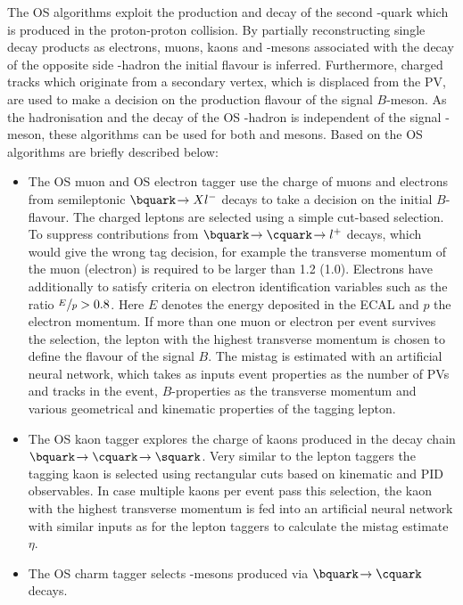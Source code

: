 The OS algorithms exploit the production and decay of the second \bquark-quark which is produced in the proton-proton collision.
By partially reconstructing single decay products as electrons, muons, kaons and \D-mesons associated with the decay of the opposite side \bquark-hadron the initial flavour is inferred.
Furthermore, charged tracks which originate from a secondary vertex, which is displaced from the \ac{PV}, are used to make a decision on the production flavour of the signal $B$-meson.
As the hadronisation and the decay of the OS \bquark-hadron is independent of the signal \B-meson, these algorithms can be used for both \Bz and \Bs mesons. Based on \cite{LHCb-PAPER-2011-027, LHCb-PAPER-2015-027} the OS algorithms are briefly described below:
\begin{itemize}
    \item The OS muon and OS electron tagger use the charge of muons and electrons from semileptonic $\bquark\!\to Xl^-$ decays to take a decision on the initial $B$-flavour.
    The charged leptons are selected using a simple cut-based selection.
    To suppress contributions from $\bquark\!\to\cquark\!\to l^+$ decays, which would give the wrong tag decision, for example the transverse momentum of the muon (electron) is required to be larger than \SI[per-mode=symbol]{1.2}{\GeVc} (\SI[per-mode=symbol]{1.0}{\GeVc}).
    Electrons have additionally to satisfy criteria on electron identification variables such as the ratio $\nicefrac{E\,}{p}>0.8$.
    Here $E$ denotes the energy deposited in the ECAL and $p$ the electron momentum.
    If more than one muon or electron per event survives the selection, the lepton with the highest transverse momentum is chosen to define the flavour of the signal $B$.
    The mistag is estimated with an artificial neural network, which takes as inputs event properties as the number of \ac{PV}s and tracks in the event, $B$-properties as the transverse momentum and various geometrical and kinematic properties of the tagging lepton.
    \item The OS kaon tagger explores the charge of kaons produced in the decay chain $\bquark\!\to\cquark\!\to\squark$.
    Very similar to the lepton taggers the tagging kaon is selected using rectangular cuts based on kinematic and PID observables.
    In case multiple kaons per event pass this selection, the kaon with the highest transverse momentum is fed into an artificial neural network with similar inputs as for the lepton taggers to calculate the mistag estimate $\eta$.
    \item The OS charm tagger selects \D-mesons produced via $\bquark\!\to\cquark$ decays.

\end{itemize}
